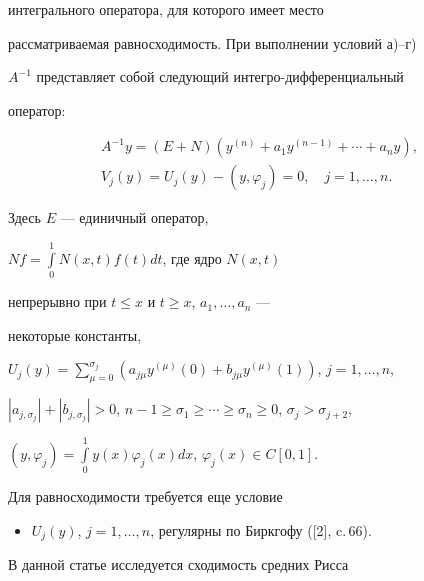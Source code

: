 интегрального оператора, для которого имеет место


рассматриваемая равносходимость. При выполнении условий а)--г)


$A^{-1}$ представляет собой следующий интегро-дифференциальный


оператор:


\begin{gather}


A^{-1}y=(E+N)(y^{(n)}+a_1y^{(n-1)}+\dotsb+a_ny), \\


%


V_j(y)=U_j(y)-(y,\varphi_j)=0,\quad j=1,\dotsc,n.


\end{gather}


Здесь $E$ --- единичный оператор,


$Nf=\int\limits_0^1N(x,t)f(t)dt$, где ядро $N(x,t)$ 


непрерывно при $t\le x$ и $t\ge x$, $a_1,\dotsc,a_n$ ---


некоторые константы,





$U_j(y)=\sum\limits_{\mu=0}^{\sigma_j}(a_{j\mu}y^{(\mu)}(0)+


b_{j\mu}y^{(\mu)}(1))$, $j=1,\dotsc,n$,





$|a_{j,\sigma_j}|+|b_{j,\sigma_j}|>0$, $n-1\ge\sigma_1\ge


\dotsb\ge\sigma_n\ge0$, $\sigma_j>\sigma_{j+2}$,





$(y,\varphi_j)=\int\limits_0^1y(x)\varphi_j(x)dx$, $\varphi_j


(x)\in C[0,1]$.





Для равносходимости требуется еще условие


\begin{itemize}


\item[д)] $U_j(y)$, $j=1,\dotsc,n$, регулярны по Биркгофу ([2], c.\,66).


\end{itemize}





В данной статье исследуется сходимость средних Рисса


